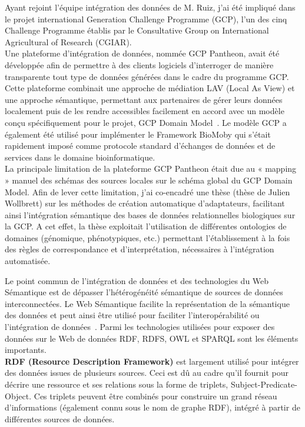 Ayant rejoint l’équipe intégration des données de M. Ruiz, j’ai été impliqué dans le projet international Generation Challenge Programme (GCP), l’un des cinq Challenge Programme établis par le Consultative Group on International Agricultural of Research (CGIAR).  \\

Une plateforme d’intégration de données, nommée GCP Pantheon, avait été développée afin de permettre à des clients logiciels d’interroger de manière transparente tout type de données générées dans le cadre du programme GCP. Cette plateforme combinait une approche de médiation LAV (Local As View) et une approche sémantique, permettant aux partenaires de gérer leurs données localement puis de les rendre accessibles facilement en accord avec un modèle conçu spécifiquement pour le projet, GCP Domain Model~\cite{Bruskiewich2006,Bruskiewich2008}. Le modèle GCP a également été utilisé pour implémenter le Framework BioMoby qui s’était rapidement imposé comme protocole standard d’échanges de données et de services dans le domaine bioinformatique.\\

La principale limitation de la plateforme GCP Pantheon était due au « mapping » manuel des schémas des sources locales sur le schéma global du GCP Domain Model. Afin de lever cette limitation, j’ai co-encadré une thèse (thèse de Julien Wollbrett) sur les méthodes de création automatique d’adaptateurs, facilitant ainsi l’intégration sémantique des bases de données relationnelles biologiques sur la GCP. A cet effet, la thèse exploitait l’utilisation de différentes ontologies de domaines (génomique, phénotypiques, etc.) permettant l’établissement à la fois des règles de correspondance et d’interprétation, nécessaires à l’intégration automatisée. 

Le point commun de l’intégration de données et des technologies du Web Sémantique est de dépasser l’hétérogénéité sémantique de sources de données interconnectées. Le Web Sémantique facilite la représentation de la sémantique des données et peut ainsi être utilisé pour faciliter l’interopérabilité ou l’intégration de données~\cite{antezana2009,Jonquet2010}. Parmi les technologies utilisées pour exposer des données sur le Web de données RDF, RDFS, OWL et SPARQL sont les éléments importants.\\

\textbf{RDF (Resource Description Framework)} est largement utilisé pour intégrer des données issues de plusieurs sources. Ceci est dû au cadre qu'il fournit pour décrire une ressource et ses relations sous la forme de triplets, Subject-Predicate-Object. Ces triplets peuvent être combinés pour construire un grand réseau d'informations (également connu sous le nom de graphe RDF), intégré à partir de différentes sources de données. %

